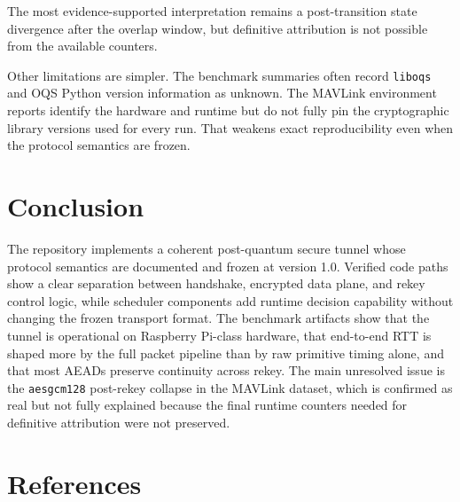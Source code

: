 \documentclass[conference]{IEEEtran}
\begin{document}
The most evidence-supported interpretation remains a post-transition state divergence after the overlap window, but definitive attribution is not possible from the available counters.

Other limitations are simpler. The benchmark summaries often record \texttt{liboqs} and OQS Python version information as unknown. The MAVLink environment reports identify the hardware and runtime but do not fully pin the cryptographic library versions used for every run. That weakens exact reproducibility even when the protocol semantics are frozen.

\section{Conclusion}
The repository implements a coherent post-quantum secure tunnel whose protocol semantics are documented and frozen at version 1.0. Verified code paths show a clear separation between handshake, encrypted data plane, and rekey control logic, while scheduler components add runtime decision capability without changing the frozen transport format. The benchmark artifacts show that the tunnel is operational on Raspberry Pi-class hardware, that end-to-end RTT is shaped more by the full packet pipeline than by raw primitive timing alone, and that most AEADs preserve continuity across rekey. The main unresolved issue is the \texttt{aesgcm128} post-rekey collapse in the MAVLink dataset, which is confirmed as real but not fully explained because the final runtime counters needed for definitive attribution were not preserved.

\section*{References}


\end{document}
